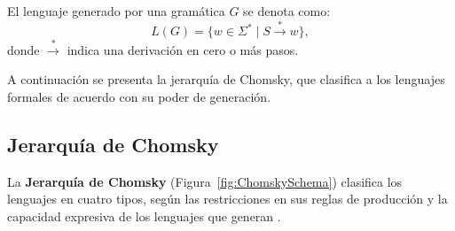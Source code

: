 \documentclass[12pt]{article}
\begin{document}
El lenguaje generado por una gramática \(G\) se denota como:
\[
  L(G) = \{ w \in \Sigma^* \mid S \overset{*}{\to} w \},
\]
donde \(\overset{*}{\to}\) indica una derivación en cero o más pasos.

A continuación se presenta la jerarquía de Chomsky, que clasifica a los lenguajes formales de acuerdo con su poder de generación.

\subsection{Jerarquía de Chomsky}

La \textbf{Jerarquía de Chomsky} (Figura~\ref{fig:ChomskySchema}) clasifica los lenguajes en cuatro tipos, según las restricciones en sus reglas de producción y la capacidad expresiva de los lenguajes que generan \cite{geeksforgeeks_chomsky_hierarchy}.
\end{document}
